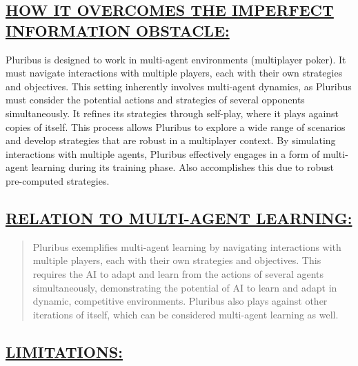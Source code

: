\documentclass[
]{article}
\begin{document}
\subsection*{\texorpdfstring{\textbf{\ul{HOW IT OVERCOMES THE IMPERFECT
INFORMATION
OBSTACLE:}}}{HOW IT OVERCOMES THE IMPERFECT INFORMATION OBSTACLE:}}\label{how-it-overcomes-the-imperfect-information-obstacle-1}

Pluribus is designed to work in multi-agent environments (multiplayer
poker). It must navigate interactions with multiple players, each with
their own strategies and objectives. This setting inherently involves
multi-agent dynamics, as Pluribus must consider the potential actions
and strategies of several opponents simultaneously. It refines its
strategies through self-play, where it plays against copies of itself.
This process allows Pluribus to explore a wide range of scenarios and
develop strategies that are robust in a multiplayer context. By
simulating interactions with multiple agents, Pluribus effectively
engages in a form of multi-agent learning during its training phase.
Also accomplishes this due to robust pre-computed strategies.

\subsection*{\texorpdfstring{\textbf{\ul{RELATION TO MULTI-AGENT
LEARNING:}}}{RELATION TO MULTI-AGENT LEARNING:}}\label{relation-to-multi-agent-learning-1}

\begin{quote}
Pluribus exemplifies multi-agent learning by navigating interactions
with multiple players, each with their own strategies and objectives.
This requires the AI to adapt and learn from the actions of several
agents simultaneously, demonstrating the potential of AI to learn and
adapt in dynamic, competitive environments. Pluribus also plays against
other iterations of itself, which can be considered multi-agent learning
as well.
\end{quote}

\subsection*{\texorpdfstring{\textbf{\ul{LIMITATIONS:}}}{LIMITATIONS:}}\label{limitations-1}
\end{document}
